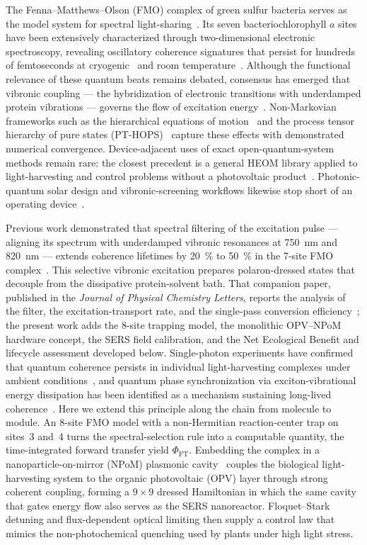 \documentclass[preprint,12pt]{elsarticle}
\begin{document}
The Fenna--Matthews--Olson (FMO) complex of green sulfur bacteria serves as the model system for spectral light-sharing~\cite{Fenna1974}.
Its seven bacteriochlorophyll $a$ sites have been extensively characterized through two-dimensional electronic spectroscopy, revealing oscillatory coherence signatures that persist for hundreds of femtoseconds at cryogenic~\cite{Engel2007} and room temperature~\cite{Panitchayangkoon2010}.
Although the functional relevance of these quantum beats remains debated, consensus has emerged that vibronic coupling --- the hybridization of electronic transitions with underdamped protein vibrations --- governs the flow of excitation energy~\cite{Chin2013,Christensson2012}.
Non-Markovian frameworks such as the hierarchical equations of motion~\cite{Tanimura1989} and the process tensor hierarchy of pure states (PT-HOPS)~\cite{Varvelo2021,Citty2024} capture these effects with demonstrated numerical convergence. Device-adjacent uses of exact open-quantum-system methods remain rare: the closest precedent is a general HEOM library applied to light-harvesting and control problems without a photovoltaic product~\cite{Lambert2023}. Photonic-quantum solar design and vibronic-screening workflows likewise stop short of an operating device~\cite{LiuFang2026,Motlagh2024}.

Previous work demonstrated that spectral filtering of the excitation pulse --- aligning its spectrum with underdamped vibronic resonances at \qty{750}{\nm} and \qty{820}{\nm} --- extends coherence lifetimes by \qty{20}{\percent} to \qty{50}{\percent} in the 7-site FMO complex~\cite{TeguiaKouam2026}.
This selective vibronic excitation prepares polaron-dressed states that decouple from the dissipative protein-solvent bath. That companion paper, published in the \textit{Journal of Physical Chemistry Letters}, reports the analysis of the filter, the excitation-transport rate, and the single-pass conversion efficiency~\cite{TeguiaKouam2026}; the present work adds the 8-site trapping model, the monolithic OPV--NPoM hardware concept, the SERS field calibration, and the Net Ecological Benefit and lifecycle assessment developed below.
Single-photon experiments have confirmed that quantum coherence persists in individual light-harvesting complexes under ambient conditions~\cite{Li2023}, and quantum phase synchronization via exciton-vibrational energy dissipation has been identified as a mechanism sustaining long-lived coherence~\cite{Zhu2024}.
Here we extend this principle along the chain from molecule to module. An 8-site FMO model with a non-Hermitian reaction-center trap on sites~3 and~4 turns the spectral-selection rule into a computable quantity, the time-integrated forward transfer yield $\Phi_{\mathrm{FT}}$. Embedding the complex in a nanoparticle-on-mirror (NPoM) plasmonic cavity~\cite{Chikkaraddy2016} couples the biological light-harvesting system to the organic photovoltaic (OPV) layer through strong coherent coupling, forming a $9\times 9$ dressed Hamiltonian in which the same cavity that gates energy flow also serves as the SERS nanoreactor. Floquet--Stark detuning and flux-dependent optical limiting then supply a control law that mimics the non-photochemical quenching used by plants under high light stress.
\end{document}
